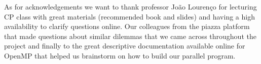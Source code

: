 As for acknowledgements we want to thank professor João Lourenço for lecturing CP class with great materials (recommended book and slides) and having a high availability to clarify questions online. Our colleagues from the piazza platform that made questions about similar dilemmas that we came across throughout the project and finally to the great descriptive documentation available online for OpenMP that helped us brainstorm on how to build our parallel program.